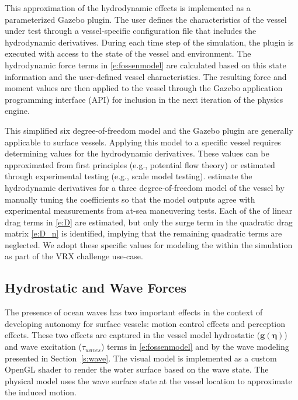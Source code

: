 \documentclass[utf8]{frontiersSCNS} %
\begin{document}
This approximation of the hydrodynamic effects is implemented as a parameterized Gazebo plugin.  The user defines the characteristics of the vessel under test through a vessel-specific configuration file that includes the hydrodynamic derivatives.  During each time step of the simulation, the plugin is executed with access to the state of the vessel and environment.  The hydrodynamic force terms in \eqref{e:fossenmodel} are calculated based on this state information and the user-defined vessel characteristics.  The resulting force and moment values are then applied to the vessel through the Gazebo application programming interface (API) for inclusion in the next iteration of the physics engine.

This simplified six degree-of-freedom model and the Gazebo plugin are generally applicable to surface vessels.  Applying this model to a specific vessel requires determining values for the hydrodynamic derivatives.  These values can be approximated from first principles (e.g., potential flow theory) or estimated through experimental testing (e.g., scale model testing).  \citet{sarda16station} estimate the hydrodynamic derivatives for a three degree-of-freedom model of the \wamv{} vessel by manually tuning the coefficients so that the model outputs agree with experimental measurements from at-sea maneuvering tests.  Each of the of linear drag terms in  \eqref{e:D} are estimated, but only the surge term in the quadratic drag matrix \eqref{e:D_n} is identified, implying that the remaining quadratic terms are neglected. We adopt these specific values for modeling the \wamv{} within the simulation as part of the VRX challenge use-case.

\subsection{Hydrostatic and Wave Forces}
The presence of ocean waves has two important effects in the context of developing autonomy for surface vessels: motion control effects and perception effects.  These two effects are captured in the vessel model hydrostatic  ($\bm{g}(\bm{\eta})$) and wave excitation ($\tau_{waves}$) terms in  \eqref{e:fossenmodel} and by the wave modeling presented in Section~\ref{s:wave}.  The visual model is implemented as a custom OpenGL shader to render the water surface based on the wave state.  The physical model uses the wave surface state at the vessel location to approximate the induced motion.  
\end{document}
